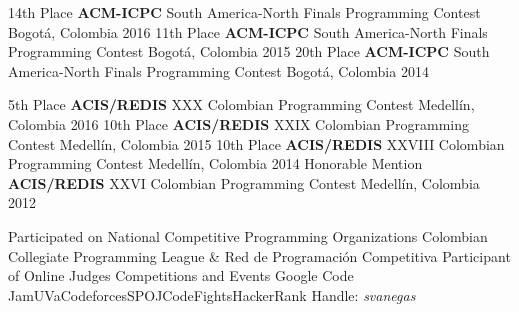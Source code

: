 
\begin{cvhonors}
  \cvhonor
    {14th Place}
    {\textbf{ACM-ICPC} South America-North Finals Programming Contest}
    {Bogotá, Colombia}
    {2016}
  \cvhonor
    {11th Place}
    {\textbf{ACM-ICPC} South America-North Finals Programming Contest}
    {Bogotá, Colombia}
    {2015}
  \cvhonor
    {20th Place}
    {\textbf{ACM-ICPC} South America-North Finals Programming Contest}
    {Bogotá, Colombia}
    {2014}
\end{cvhonors}

\begin{cvhonors}
  \cvhonor
    {5th Place}
    {\textbf{ACIS/REDIS} XXX Colombian Programming Contest}
    {Medellín, Colombia}
    {2016}
  \cvhonor
    {10th Place}
    {\textbf{ACIS/REDIS} XXIX Colombian Programming Contest}
    {Medellín, Colombia}
    {2015}
  \cvhonor
    {10th Place}
    {\textbf{ACIS/REDIS} XXVIII Colombian Programming Contest}
    {Medellín, Colombia}
    {2014}
  \cvhonor
    {Honorable Mention}
    {\textbf{ACIS/REDIS} XXVI Colombian Programming Contest}
    {Medellín, Colombia}
    {2012}
\end{cvhonors}

\begin{cvhonors}
  \cvhonor
    {Participated on National Competitive Programming Organizations}
    {Colombian Collegiate Programming League \& Red de Programación Competitiva}
    {}
    {}
  \cvhonor
    {Participant of Online Judges Competitions and Events}
    {Google Code Jam{\dotsep}UVa{\dotsep}Codeforces{\dotsep}SPOJ{\dotsep}CodeFights{\dotsep}HackerRank}
    {Handle: \textit{svanegas}}
    {}
\end{cvhonors}
